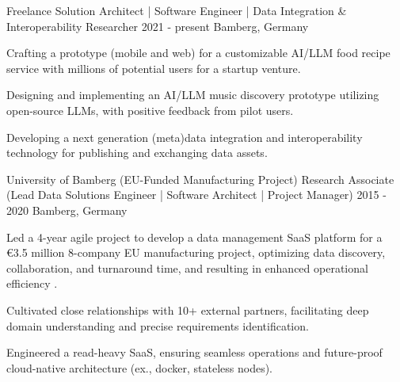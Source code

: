 {}


\begin{cventries}




    
        
  \cventry
    {Freelance} %
    {Solution Architect | Software Engineer | Data Integration \& Interoperability Researcher}
    {2021 - present} %
    {Bamberg, Germany} %
    {
      \begin{cvitems} %
		\item {Crafting a prototype (mobile and web) for a customizable AI/LLM food recipe service with millions of potential users for a startup venture.}
		\item {Designing and implementing an AI/LLM music discovery prototype utilizing open-source LLMs, with positive feedback from pilot users.}
		\item {Developing a next generation (meta)data integration and interoperability technology for publishing and exchanging data assets.}
    \end{cvitems}
    }
    



    
        
  \cventry
    {University of Bamberg (EU-Funded Manufacturing Project)} %
    {Research Associate (Lead Data Solutions Engineer | Software Architect | Project Manager)}
    {2015 - 2020} %
    {Bamberg, Germany} %
    {
      \begin{cvitems} %
		\item {Led a 4-year agile project to develop a data management SaaS platform for a €3.5 million 8-company EU manufacturing project, optimizing data discovery, collaboration, and turnaround time, and resulting in enhanced operational efficiency .}
		\item {Cultivated close relationships with 10+ external partners, facilitating deep domain understanding and precise requirements identification.}
		\item {Engineered a read-heavy SaaS, ensuring seamless operations and future-proof cloud-native architecture (ex., docker, stateless nodes).}
      \end{cvitems}
    }


\end{cventries}
